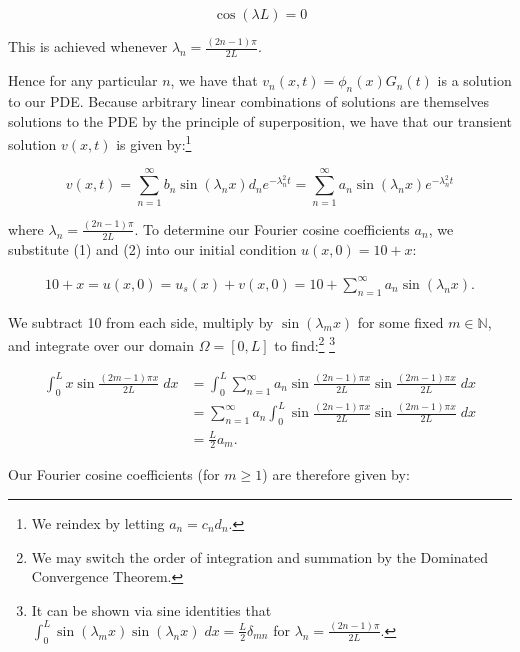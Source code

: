 \begin{solution}
    $$
    \cos{(\lambda L)} = 0
    $$

    This is achieved whenever $\lambda_n = \frac{(2 n - 1) \pi}{2L}$.

    Hence for any particular $n$, we have that $v_n(x, t) = \phi_n(x)G_n(t)$ is a solution to our PDE. Because arbitrary
    linear combinations of solutions are themselves solutions to the PDE by the principle of superposition, we have that
    our transient solution $v(x, t)$ is given by:\footnote{
        We reindex by letting $a_n = c_n d_n$.
    }

    \begin{equation}
    v(x, t) = \sum\limits_{n=1}^{\infty}{b_n \sin{(\lambda_n x)}} d_n e^{-\lambda_n^2 t}
            = \sum\limits_{n=1}^{\infty}{a_n \sin{(\lambda_n x)}} e^{-\lambda_n^2 t}
    \end{equation}

    where $\lambda_n = \frac{(2 n - 1) \pi}{2L}$. To determine our Fourier cosine coefficients $a_n$, we substitute (1)
    and (2) into our initial condition $u(x, 0) = 10 + x$:

    \begin{align*}
        10 + x = u(x, 0) = u_s(x) + v(x, 0) = 10 + \sum\limits_{n=1}^{\infty}{a_n \sin{(\lambda_n x)}}.
    \end{align*}

    We subtract 10 from each side, multiply by $\sin{(\lambda_m x)}$ for some fixed $m \in \mathbb{N}$, and 
    integrate over our domain $\Omega = [0, L]$ to find:\footnote{
        We may switch the order of integration and summation by the Dominated Convergence Theorem.
    } \footnote{
        It can be shown via sine identities that 
        $\int_0^L{\sin{(\lambda_m x)} \sin{(\lambda_n x)}}\; dx = \frac{L}{2} \delta_{mn}$ for 
        $\lambda_n = \frac{(2n - 1) \pi}{2L}$.
    }

    \begin{align*}
        \int_{0}^{L}{x \sin{\frac{(2 m - 1) \pi x}{2L}}\; dx}
            &= \int_{0}^{L}{\sum\limits_{n=1}^{\infty}{a_n \sin{\frac{(2 n - 1) \pi x}{2L}} \sin{\frac{(2 m - 1) \pi x}{2L}} }\; dx} \\
            &= \sum\limits_{n=1}^{\infty}{a_n \int_{0}^{L}{\sin{\frac{(2 n - 1) \pi x}{2L}} \sin{\frac{(2 m - 1) \pi x}{2L}} \; dx }} \\
            &= \frac{L}{2} a_m.
    \end{align*}

    Our Fourier cosine coefficients (for $m \ge 1$) are therefore given by:


\end{solution}
